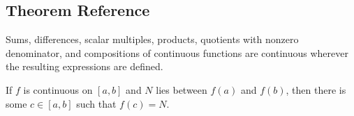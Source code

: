 \subsection*{Theorem Reference}

\begin{theorem*}
Sums, differences, scalar multiples, products, quotients with nonzero
denominator, and compositions of continuous functions are continuous wherever
the resulting expressions are defined.
\end{theorem*}

\begin{theorem*}
If \(f\) is continuous on \([a,b]\) and \(N\) lies between \(f(a)\) and
\(f(b)\), then there is some \(c\in[a,b]\) such that \(f(c)=N\).
\end{theorem*}
